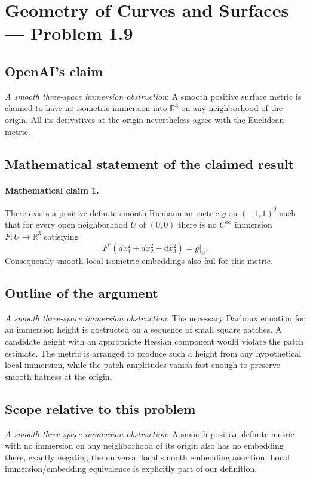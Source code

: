 \documentclass[11pt]{article}
\begin{document}
\section*{Geometry of Curves and Surfaces — Problem 1.9}

\subsection{OpenAI's claim}
\textit{A smooth three-space immersion obstruction}: A smooth positive surface metric is claimed to have no isometric immersion into $\mathbb R^3$ on any neighborhood of the origin. All its derivatives at the origin nevertheless agree with the Euclidean metric.

\subsection{Mathematical statement of the claimed result}
\paragraph{Mathematical claim 1.} There exists a positive-definite smooth Riemannian metric $g$ on $(-1,1)^2$ such that for every open neighborhood $U$ of $(0,0)$ there is no $C^\infty$ immersion $F:U\to\mathbb R^3$ satisfying \[F^*(dx_1^2+dx_2^2+dx_3^2)=g|_U.\] Consequently smooth local isometric embeddings also fail for this metric.

\subsection{Outline of the argument}
\textit{A smooth three-space immersion obstruction}: The necessary Darboux equation for an immersion height is obstructed on a sequence of small square patches. A candidate height with an appropriate Hessian component would violate the patch estimate. The metric is arranged to produce such a height from any hypothetical local immersion, while the patch amplitudes vanish fast enough to preserve smooth flatness at the origin.

\subsection{Scope relative to this problem}
\textit{A smooth three-space immersion obstruction}: A smooth positive-definite metric with no immersion on any neighborhood of its origin also has no embedding there, exactly negating the universal local smooth embedding assertion. Local immersion/embedding equivalence is explicitly part of our definition.
\end{document}

